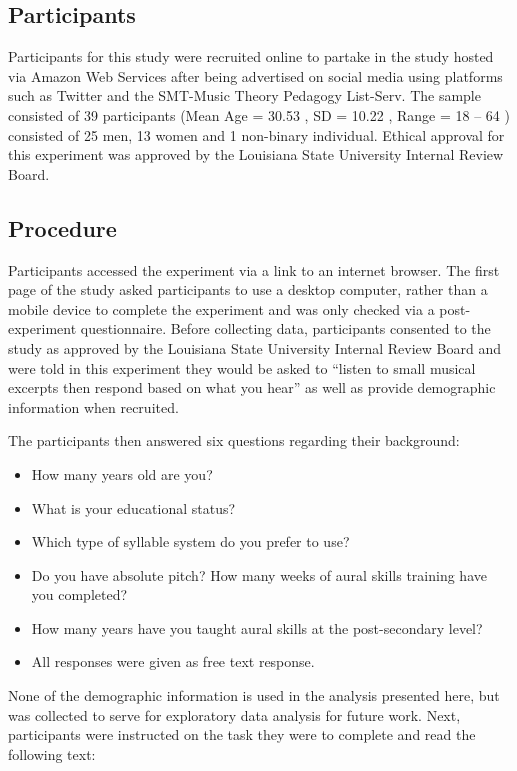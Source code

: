 \documentclass[english,man]{apa6}
\providecommand{\tightlist}{%
  \setlength{\itemsep}{0pt}\setlength{\parskip}{0pt}}
\begin{document}
\hypertarget{participants}{%
\subsection{Participants}\label{participants}}

Participants for this study were recruited online to partake in the study hosted via Amazon Web Services after being advertised on social media using platforms such as Twitter and the SMT-Music Theory Pedagogy List-Serv.
The sample consisted of 39 participants (Mean Age = 30.53 , SD = 10.22 , Range = 18 -- 64 ) consisted of 25 men, 13 women and 1 non-binary individual.
Ethical approval for this experiment was approved by the Louisiana State University Internal Review Board.

\hypertarget{procedure}{%
\subsection{Procedure}\label{procedure}}

Participants accessed the experiment via a link to an internet browser.
The first page of the study asked participants to use a desktop computer, rather than a mobile device to complete the experiment and was only checked via a post-experiment questionnaire.
Before collecting data, participants consented to the study as approved by the Louisiana State University Internal Review Board and were told in this experiment they would be asked to \enquote{listen to small musical excerpts then respond based on what you hear} as well as provide demographic information when recruited.

The participants then answered six questions regarding their background:

\begin{itemize}
\tightlist
\item
  How many years old are you?
\item
  What is your educational status?
\item
  Which type of syllable system do you prefer to use?
\item
  Do you have absolute pitch? How many weeks of aural skills training have you completed?
\item
  How many years have you taught aural skills at the post-secondary level?
\item
  All responses were given as free text response.
\end{itemize}

None of the demographic information is used in the analysis presented here, but was collected to serve for exploratory data analysis for future work.
Next, participants were instructed on the task they were to complete and read the following text:
\end{document}
